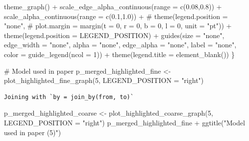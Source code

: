 \documentclass[
  letterpaper,
  DIV=11,
  numbers=noendperiod]{scrartcl}
\newenvironment{Shaded}{\begin{snugshade}}{\end{snugshade}}
\newcommand{\AttributeTok}[1]{\textcolor[rgb]{0.40,0.45,0.13}{#1}}
\newcommand{\CommentTok}[1]{\textcolor[rgb]{0.37,0.37,0.37}{#1}}
\newcommand{\DecValTok}[1]{\textcolor[rgb]{0.68,0.00,0.00}{#1}}
\newcommand{\FloatTok}[1]{\textcolor[rgb]{0.68,0.00,0.00}{#1}}
\newcommand{\FunctionTok}[1]{\textcolor[rgb]{0.28,0.35,0.67}{#1}}
\newcommand{\NormalTok}[1]{\textcolor[rgb]{0.00,0.23,0.31}{#1}}
\newcommand{\OtherTok}[1]{\textcolor[rgb]{0.00,0.23,0.31}{#1}}
\newcommand{\SpecialCharTok}[1]{\textcolor[rgb]{0.37,0.37,0.37}{#1}}
\newcommand{\StringTok}[1]{\textcolor[rgb]{0.13,0.47,0.30}{#1}}
\begin{document}
\begin{Shaded}
\begin{Highlighting}[]
        \FunctionTok{theme\_graph}\NormalTok{() }\SpecialCharTok{+}
        \FunctionTok{scale\_edge\_alpha\_continuous}\NormalTok{(}\AttributeTok{range =} \FunctionTok{c}\NormalTok{(}\FloatTok{0.08}\NormalTok{,}\FloatTok{0.8}\NormalTok{)) }\SpecialCharTok{+}
        \FunctionTok{scale\_alpha\_continuous}\NormalTok{(}\AttributeTok{range =} \FunctionTok{c}\NormalTok{(}\FloatTok{0.1}\NormalTok{,}\FloatTok{1.0}\NormalTok{)) }\SpecialCharTok{+}
        \CommentTok{\# theme(legend.position = "none",}
        \CommentTok{\#       plot.margin = margin(t = 0, r = 0, b = 0, l = 0, unit = "pt")) +}
        \FunctionTok{theme}\NormalTok{(}\AttributeTok{legend.position =}\NormalTok{ LEGEND\_POSITION) }\SpecialCharTok{+}
        \FunctionTok{guides}\NormalTok{(}\AttributeTok{size =} \StringTok{"none"}\NormalTok{, }\AttributeTok{edge\_width =} \StringTok{"none"}\NormalTok{, }\AttributeTok{alpha =} \StringTok{"none"}\NormalTok{, }\AttributeTok{edge\_alpha =} \StringTok{"none"}\NormalTok{,}
               \AttributeTok{label =} \StringTok{"none"}\NormalTok{,}
               \AttributeTok{color =} \FunctionTok{guide\_legend}\NormalTok{(}\AttributeTok{ncol =} \DecValTok{1}\NormalTok{)) }\SpecialCharTok{+}
        \FunctionTok{theme}\NormalTok{(}\AttributeTok{legend.title =} \FunctionTok{element\_blank}\NormalTok{())}
\NormalTok{\}}

\CommentTok{\# Model used in paper}
\NormalTok{p\_merged\_highlighted\_fine }\OtherTok{\textless{}{-}} \FunctionTok{plot\_highlighted\_fine\_graph}\NormalTok{(}\DecValTok{5}\NormalTok{, }\AttributeTok{LEGEND\_POSITION =} \StringTok{"right"}\NormalTok{)}
\end{Highlighting}
\end{Shaded}

\begin{verbatim}
Joining with `by = join_by(from, to)`
\end{verbatim}

\begin{Shaded}
\begin{Highlighting}[]
\NormalTok{p\_merged\_highlighted\_coarse }\OtherTok{\textless{}{-}} \FunctionTok{plot\_highlighted\_coarse\_graph}\NormalTok{(}\DecValTok{5}\NormalTok{, }\AttributeTok{LEGEND\_POSITION =} \StringTok{"right"}\NormalTok{)}
\NormalTok{p\_merged\_highlighted\_fine }\SpecialCharTok{+} \FunctionTok{ggtitle}\NormalTok{(}\StringTok{"Model used in paper (5)"}\NormalTok{)}
\end{Highlighting}
\end{Shaded}
\end{document}
